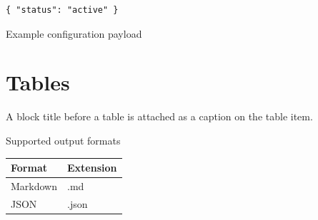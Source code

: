 \documentclass[11pt,a4paper]{article}
\begin{document}
\begin{verbatim}
{ "status": "active" }
\end{verbatim}

Example configuration payload

\section{Tables}

A block title before a table is attached as a caption on the table item.

Supported output formats

\begin{table}[h]
\begin{tabular}{|l|l|}
\hline
Format & Extension \\ \hline
Markdown & .md \\ \hline
JSON & .json \\ \hline
\end{tabular}
\end{table}
\end{document}
